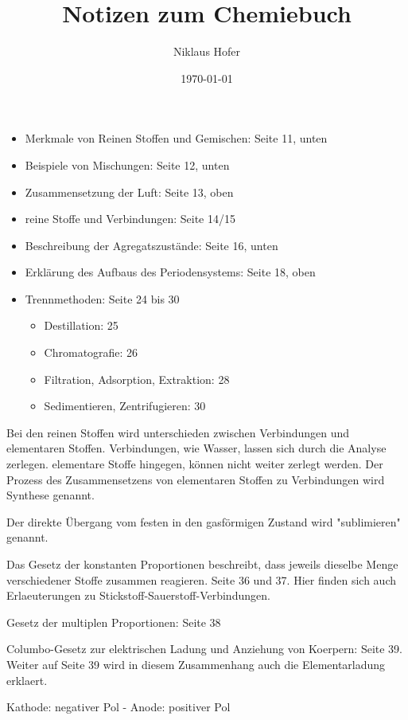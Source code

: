 \documentclass[11pt,paper=a4,final]{scrartcl}
\title{Notizen zum Chemiebuch}
\author{Niklaus Hofer}
\date{\today{}}
\begin{document}
\maketitle

\begin{itemize}
  \item Merkmale von Reinen Stoffen und Gemischen: Seite 11, unten
  \item Beispiele von Mischungen: Seite 12, unten
  \item Zusammensetzung der Luft: Seite 13, oben
  \item reine Stoffe und Verbindungen: Seite 14/15
  \item Beschreibung der Agregatszust\"ande: Seite 16, unten
  \item Erkl\"arung des Aufbaus des Periodensystems: Seite 18, oben
  \item Trennmethoden: Seite 24 bis 30
    \begin{itemize}
      \item Destillation: 25
      \item Chromatografie: 26
      \item Filtration, Adsorption, Extraktion: 28
      \item Sedimentieren, Zentrifugieren: 30
    \end{itemize}
\end{itemize}

Bei den reinen Stoffen wird unterschieden zwischen Verbindungen und elementaren
Stoffen. Verbindungen, wie Wasser, lassen sich durch die Analyse zerlegen.
elementare Stoffe hingegen, k\"onnen nicht weiter zerlegt werden. Der Prozess
des Zusammensetzens von elementaren Stoffen zu Verbindungen wird Synthese
genannt. 

Der direkte \"Ubergang vom festen in den gasf\"ormigen Zustand wird
"sublimieren" genannt.

Das Gesetz der konstanten Proportionen beschreibt, dass jeweils dieselbe Menge
verschiedener Stoffe zusammen reagieren. Seite 36 und 37. Hier finden sich auch
Erlaeuterungen zu Stickstoff-Sauerstoff-Verbindungen.

Gesetz der multiplen Proportionen: Seite 38

Columbo-Gesetz zur elektrischen Ladung und Anziehung von Koerpern: Seite 39.
Weiter auf Seite 39 wird in diesem Zusammenhang auch die Elementarladung
erklaert.

Kathode: negativer Pol - Anode: positiver Pol
\end{document}
